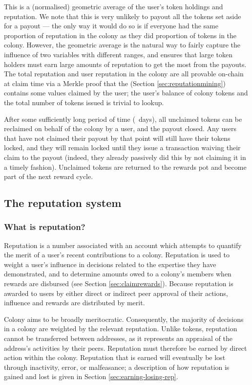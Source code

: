 This is a (normalised) geometric average of the user's token holdings and reputation. We note that this is very unlikely to payout all the tokens set aside for a payout --- the only way it would do so is if everyone had the same proportion of reputation in the colony as they did proportion of tokens in the colony. However, the geometric average is the natural way to fairly capture the influence of two variables with different ranges, and ensures that large token holders must earn large amounts of reputation to get the most from the payouts. The total reputation and user reputation in the colony are all provable on-chain at claim time via a Merkle proof that the  (Section \ref{sec:reputationmining}) contains some values claimed by the user; the user's balance of colony tokens and the total number of tokens issued is trivial to lookup.

After some sufficiently long period of time (\rewardclaimduration\ days), all unclaimed tokens can be reclaimed on behalf of the colony by a user, and the payout closed. Any users that have not claimed their payout by that point will still have their tokens locked, and they will remain locked until they issue a transaction waiving their claim to the payout (indeed, they already passively did this by not claiming it in a timely fashion). Unclaimed tokens are returned to the rewards pot and become part of the next reward cycle.

\subsection{The reputation system}\label{sec:reputation}

\subsubsection{What is reputation?}\label{subsec:what-is-reputation}

Reputation is a number associated with an account which attempts to quantify the merit of a user's recent contributions to a colony. Reputation is used to weight a user's influence in decisions related to the expertise they have demonstrated, and to determine amounts owed to a colony's members when rewards are disbursed (see Section \ref{sec:claimrewards}). Because reputation is awarded to users by either direct or indirect peer approval of their actions, influence and rewards are distributed by merit.

Colony aims to be broadly meritocratic. Consequently, the majority of decisions in a colony are weighted by the relevant reputation. Unlike tokens, reputation cannot be transferred between addresses, as it represents an appraisal of the address's activities by their peers. Reputation must therefore be earned by direct action within the colony. Reputation that is earned will eventually be lost through inactivity, error, or malfeasance; a description of how reputation is gained and lost is given in Section \ref{sec:earning-losing-rep}.

